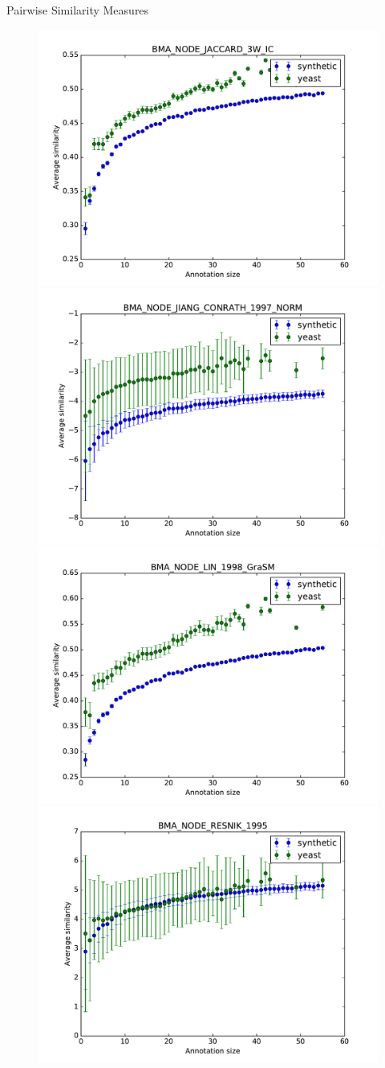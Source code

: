 \documentclass{beamer}
\begin{document}
\begin{frame}{Pairwise Similarity Measures}

\begin{figure}
\includegraphics[width=0.5\linewidth, height=0.4\textheight]{pairwise/SIM_GROUPWISE_BMA_SIM_PAIRWISE_DAG_NODE_JACCARD_3W_IC_avg.pdf}
\includegraphics[width=0.5\linewidth, height=0.4\textheight]{pairwise/SIM_GROUPWISE_BMA_SIM_PAIRWISE_DAG_NODE_JIANG_CONRATH_1997_NORM_avg.pdf} \\
\includegraphics[width=0.5\linewidth, height=0.4\textheight]{pairwise/SIM_GROUPWISE_BMA_SIM_PAIRWISE_DAG_NODE_LIN_1998_GraSM_avg.pdf}
\includegraphics[width=0.5\linewidth, height=0.4\textheight]{pairwise/SIM_GROUPWISE_BMA_SIM_PAIRWISE_DAG_NODE_RESNIK_1995_avg.pdf}
\end{figure}

\end{frame}
\end{document}
